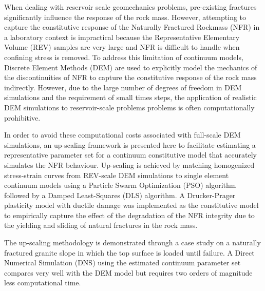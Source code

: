 When dealing with reservoir scale geomechanics problems, pre-existing fractures significantly influence the response of the rock mass. However, attempting to capture the constitutive response of the Naturally Fractured Rockmass (NFR) in a laboratory context is impractical because the Representative Elementary Volume (REV) samples are very large and NFR is difficult to handle when confining stress is removed. To address this limitation of continuum models, Discrete Element Methods (DEM) are used to explicitly model the mechanics of the discontinuities of NFR to capture the constitutive response of the rock mass indirectly. However, due to the large number of degrees of freedom in DEM simulations and the requirement of small times steps, the application of realistic DEM simulations to reservoir-scale problems problems is often computationally prohibitive. 

In order to avoid these computational costs associated with full-scale DEM simulations, an up-scaling framework is presented here to facilitate estimating a representative parameter set for a continuum constitutive model that accurately simulates the NFR behaviour. Up-scaling is achieved by matching homogenized stress-strain curves from REV-scale DEM simulations to single element continuum models using a Particle Swarm Optimization (PSO) algorithm followed by a Damped Least-Squares (DLS) algorithm. A Drucker-Prager plasticity model with ductile damage was implemented as the constitutive model to empirically capture the effect of the degradation of the NFR integrity due to the yielding and sliding of natural fractures in the rock mass.

The up-scaling methodology is demonstrated through a case study on a naturally fractured granite slope in which the top surface is loaded until failure. A Direct Numerical Simulation (DNS) using the estimated continuum parameter set compares very well with the DEM model but requires two orders of magnitude less computational time.